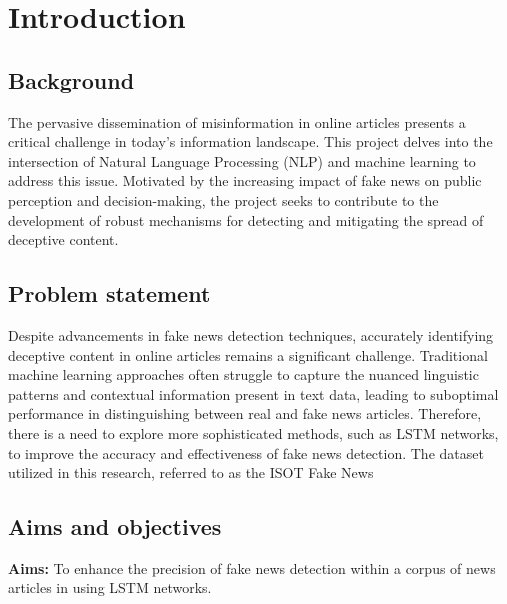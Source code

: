 \chapter{Introduction}
\label{ch:into} %



\section{Background}
\label{sec:into_back}
The pervasive dissemination of misinformation in online articles presents a critical challenge 
in today's information landscape. This project delves into the intersection of Natural Language 
Processing (NLP) and machine learning to address this issue. Motivated by the increasing impact 
of fake news on public perception and decision-making, the project seeks to contribute to the 
development of robust mechanisms for detecting and mitigating the spread of deceptive content. 

\section{Problem statement}
\label{sec:intro_prob_art}
Despite advancements in fake news detection techniques, accurately identifying deceptive content in online articles remains a significant challenge. Traditional machine learning approaches often struggle to capture the nuanced linguistic patterns and contextual information present in text data, leading to suboptimal performance in distinguishing between real and fake news articles. Therefore, there is a need to explore more sophisticated methods, such as LSTM networks, to improve the accuracy and effectiveness of fake news detection. The  dataset utilized in this research, referred to as the ISOT Fake News \cite{fake-news}

\section{Aims and objectives}
\label{sec:intro_aims_obj}
\textbf{Aims:} To enhance the precision of fake news detection within a corpus of news articles in \cite{fake-news} using LSTM networks. 

